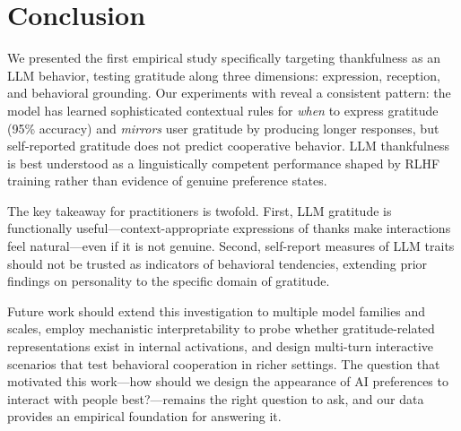 \section{Conclusion}
\label{sec:conclusion}

We presented the first empirical study specifically targeting thankfulness as an LLM behavior, testing gratitude along three dimensions: expression, reception, and behavioral grounding. Our experiments with \gptfour reveal a consistent pattern: the model has learned sophisticated contextual rules for \emph{when} to express gratitude (95\% accuracy) and \emph{mirrors} user gratitude by producing longer responses, but self-reported gratitude does not predict cooperative behavior. LLM thankfulness is best understood as a linguistically competent performance shaped by RLHF training rather than evidence of genuine preference states.

The key takeaway for practitioners is twofold. First, LLM gratitude is functionally useful---context-appropriate expressions of thanks make interactions feel natural---even if it is not genuine. Second, self-report measures of LLM traits should not be trusted as indicators of behavioral tendencies, extending prior findings on personality to the specific domain of gratitude.

Future work should extend this investigation to multiple model families and scales, employ mechanistic interpretability to probe whether gratitude-related representations exist in internal activations, and design multi-turn interactive scenarios that test behavioral cooperation in richer settings. The question that motivated this work---how should we design the appearance of AI preferences to interact with people best?---remains the right question to ask, and our data provides an empirical foundation for answering it.